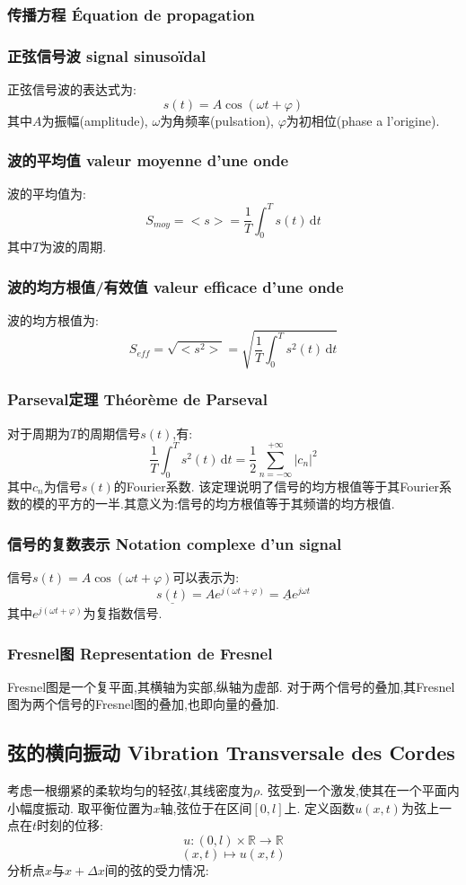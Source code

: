 \documentclass[12pt, a4paper, oneside]{ctexbook}
\newcommand{\R }{\mathbb{R}}%
\newcommand{\x }{$x$}\newcommand{\xo }{$x_0$}
\begin{document}
  \subsubsection{传播方程 Équation de propagation}

  \subsubsection{正弦信号波 signal sinusoïdal}
  正弦信号波的表达式为:
  $$
    s(t)=A\cos(\omega t+\varphi)
  $$
  其中$A$为振幅(amplitude), $\omega$为角频率(pulsation), $\varphi$为初相位(phase a l'origine).
  \subsubsection{波的平均值 valeur moyenne d'une onde}
  波的平均值为:
  $$
    S_{moy}=<s>=\frac{1}{T}\int_{0}^{T}s(t)\,\mathrm{d}t
  $$
  其中$T$为波的周期.
  \subsubsection{波的均方根值/有效值 valeur efficace d'une onde}
  波的均方根值为:
  $$
    S_{eff}=\sqrt{<s^2>}=\sqrt{\frac{1}{T}\int_{0}^{T}s^2(t)\,\mathrm{d}t}
  $$

  \subsubsection{Parseval定理 Théorème de Parseval}
  对于周期为$T$的周期信号$s(t)$,有:
  $$
    \frac{1}{T}\int_{0}^{T}s^2(t)\,\mathrm{d}t=\frac{1}{2}\sum_{n=-\infty}^{+\infty}|c_n|^2
  $$
  其中$c_n$为信号$s(t)$的Fourier系数.
  该定理说明了信号的均方根值等于其Fourier系数的模的平方的一半.其意义为:信号的均方根值等于其频谱的均方根值.
  \subsubsection{信号的复数表示 Notation complexe d'un signal}
  信号$s(t)=A\cos(\omega t+\varphi)$可以表示为:
  $$
    \underline{s(t)}=Ae^{j(\omega t+\varphi)}=\underline{A}e^{j\omega t}
  $$
  其中$e^{j(\omega t+\varphi)}$为复指数信号.
  \subsubsection{Fresnel图 Representation de Fresnel}
  Fresnel图是一个复平面,其横轴为实部,纵轴为虚部.
  对于两个信号的叠加,其Fresnel图为两个信号的Fresnel图的叠加,也即向量的叠加.
  \subsection{弦的横向振动 Vibration Transversale des Cordes}
  考虑一根绷紧的柔软均匀的轻弦$l$,其线密度为$\rho$.
  弦受到一个激发,使其在一个平面内小幅度振动.
  取平衡位置为\x 轴,弦位于在区间$[0,l]$上.
  定义函数$u(x,t)$为弦上一点在$t$时刻的位移:
  $$
    u:(0,l)\times \R\rightarrow \R
  $$
  $$
    (x,t)\mapsto u(x,t)
  $$
  分析点\x 与$x+\Delta x$间的弦的受力情况:\\
\end{document}
